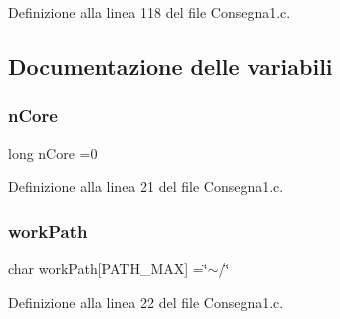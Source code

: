 Definizione alla linea 118 del file Consegna1.\+c.



\subsection{Documentazione delle variabili}
\mbox{\label{a00008_aa458de5166b611b8c2c9c8e7a4a87d87}} 
\subsubsection{\texorpdfstring{nCore}{nCore}}
{\footnotesize\ttfamily long n\+Core =0}



Definizione alla linea 21 del file Consegna1.\+c.

\mbox{\label{a00008_a0e6ffcfac15a20d9a6157dd0fd804d28}} 
\subsubsection{\texorpdfstring{workPath}{workPath}}
{\footnotesize\ttfamily char work\+Path\mbox{[}P\+A\+T\+H\+\_\+\+M\+AX\mbox{]} =\char`\"{}$\sim$/\char`\"{}}



Definizione alla linea 22 del file Consegna1.\+c.

